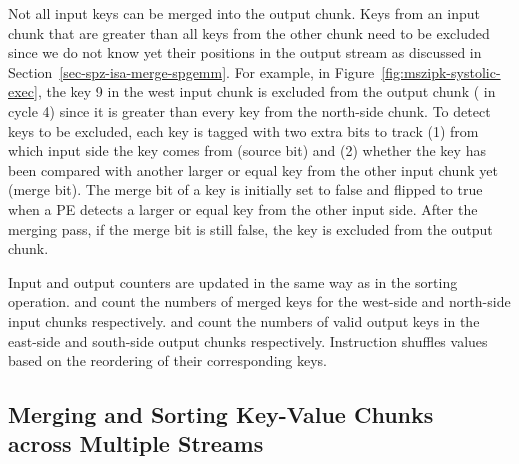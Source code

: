 Not all input keys can be merged into the output chunk.
Keys from an input chunk that are greater than all keys from the other chunk
need to be excluded since we do not know yet their positions in the output
stream as discussed in Section~\ref{sec-spz-isa-merge-spgemm}.
For example, in Figure~\ref{fig:mszipk-systolic-exec}, the key 9 in the west
input chunk is excluded from the output chunk ( in cycle 4) since
it is greater than every key from the north-side chunk.
To detect keys to be excluded, each key is tagged with two extra bits to track
(1) from which input side the key comes from (source bit) and (2) whether the
key has been compared with another larger or equal key from the other input
chunk yet (merge bit).
The merge bit of a key is initially set to false and flipped to true when a
PE detects a larger or equal key from the other input side.
After the merging pass, if the merge bit is still false, the key is excluded
from the output chunk.

Input and output counters are updated in the same way as in the sorting
operation.
 and  count the numbers of merged keys for the
west-side and north-side input chunks respectively.
 and  count the numbers of valid output keys in the
east-side and south-side output chunks respectively.
Instruction  shuffles values based on the reordering of their
corresponding keys.

\subsection{Merging and Sorting Key-Value Chunks \\ across Multiple Streams}
\label{sec-spz-uarch-multi-rows}

